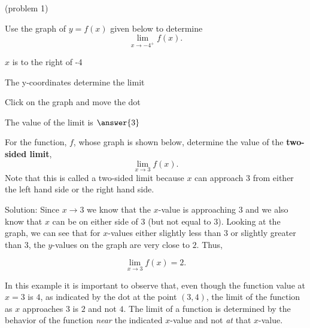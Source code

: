 \documentclass[handout]{ximera}
\begin{document}
\begin{problem}(problem 1)




Use the graph of $y = f(x)$ given below to determine
  \[
  \lim_{x\to -4^+} f(x).
  \]
  
    \begin{hint}
      $x$ is to the right of -4
    \end{hint}
    \begin{hint}
      The y-coordinates determine the limit
    \end{hint}
		\begin{hint}
		  Click on the graph and move the dot
		\end{hint}
		The value of the limit is
		 $\answer{3}$

\end{problem}


\begin{example}[example 2]
For the function, $f$, whose graph is shown below, determine the value of the \textbf{two-sided limit}, 
\[
\lim_{x\to 3} f(x).
\]
Note that this is called a two-sided limit because $x$ can 
approach $3$ from either the left hand side or the right hand side.



\vspace{.25in}
Solution: Since $x \to 3$ we know that the $x$-value is approaching $3$ and we also know 
that $x$ can be on either side of $3$ (but not equal to 3). 
Looking at the graph, we can see that for $x$-values either slightly less than $3$ or slightly greater than $3$, 
the $y$-values on the graph are very close to $2$. Thus, 

\[
\lim_{x\to 3} f(x) = 2.
\]

In this example it is important to observe that, even though the function value at $x= 3$ is $4$, 
as indicated by the dot at the point $(3,4)$, the limit of the function as $x$ approaches $3$ is $2$ and not $4$.  
The limit of a function is determined by the behavior of the function \textit{near} the 
indicated $x$-value and not \textit{at} that $x$-value.\\

\end{example}
\end{document}
